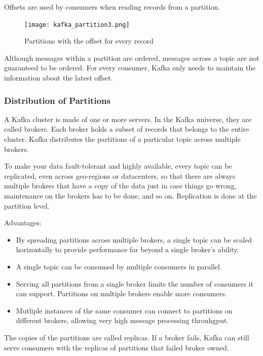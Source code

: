 Offsets are used by consumers when reading records from a partition.

\begin{figure}[ht]
    \centering
    \texttt{[image: kafka\_partition3.png]}
    \caption{Partitions with the offset for every record}
\end{figure}

Although messages within a partition are ordered, messages across a topic are
not guaranteed to be ordered.
For every consumer, Kafka only needs to maintain the information about the
latest offset.

\subsubsection{Distribution of Partitions}

A Kafka cluster is made of one or more servers. In the Kafka universe, they are
called brokers.
Each broker holds a subset of records that belongs to the entire cluster.
Kafka distributes the partitions of a particular topic across multiple brokers.

To make your data fault-tolerant and highly available, every topic can be
replicated, even across geo-regions or datacenters, so that there are always
multiple brokers that have a copy of the data just in case things go wrong,
maintenance on the brokers has to be done, and so on.
Replication is done at the partition level.

Advantages:
\begin{itemize}
    \item   By spreading partitions across multiple brokers, a single topic can
            be scaled horizontally to provide performance far beyond a single
            broker's ability.
    \item   A single topic can be consumed by multiple consumers in parallel.
    \item   Serving all partitions from a single broker limits the number of
            consumers it can support. Partitions on multiple brokers enable
            more consumers.
    \item   Mutliple instances of the same consumer can connect to partitions
            on different brokers, allowing very high message processing
            throuhgput.
\end{itemize}

The copies of the partitions are called replicas. If a broker fails, Kafka
can still serve consumers with the replicas of partitions that failed broker
owned.

